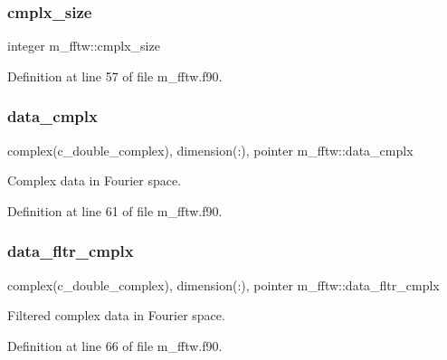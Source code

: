 \mbox{\label{namespacem__fftw_afa99ee82497ae0ee316e97734ad0d7d3}} 
\subsubsection{\texorpdfstring{cmplx\+\_\+size}{cmplx\_size}}
{\footnotesize\ttfamily integer m\+\_\+fftw\+::cmplx\+\_\+size}



Definition at line 57 of file m\+\_\+fftw.\+f90.

\mbox{\label{namespacem__fftw_a46b5b6c6849f50f0fe5f96301520e981}} 
\subsubsection{\texorpdfstring{data\+\_\+cmplx}{data\_cmplx}}
{\footnotesize\ttfamily complex(c\+\_\+double\+\_\+complex), dimension(\+:), pointer m\+\_\+fftw\+::data\+\_\+cmplx}



Complex data in Fourier space. 



Definition at line 61 of file m\+\_\+fftw.\+f90.

\mbox{\label{namespacem__fftw_a2baa49912c2585f5937bcb41804edc3a}} 
\subsubsection{\texorpdfstring{data\+\_\+fltr\+\_\+cmplx}{data\_fltr\_cmplx}}
{\footnotesize\ttfamily complex(c\+\_\+double\+\_\+complex), dimension(\+:), pointer m\+\_\+fftw\+::data\+\_\+fltr\+\_\+cmplx}



Filtered complex data in Fourier space. 



Definition at line 66 of file m\+\_\+fftw.\+f90.

\mbox{\label{namespacem__fftw_a5fc31000de6fec8b2dc1a9a1259f8089}} 
